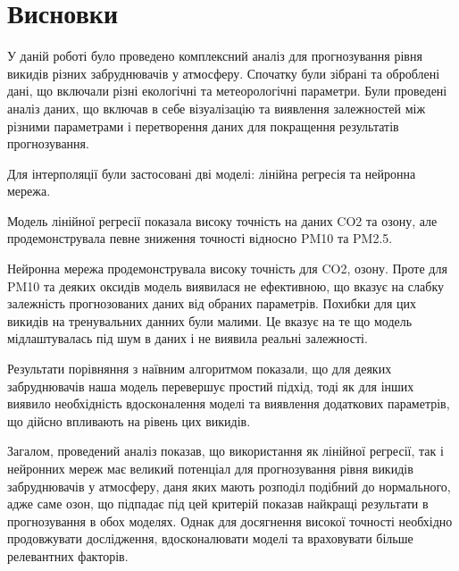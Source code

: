 \chapter{Висновки}

У даній роботі було проведено комплексний аналіз для прогнозування рівня викидів різних забруднювачів у атмосферу. 
Спочатку були зібрані та оброблені дані, що включали різні екологічні та метеорологічні параметри. 
Були проведені аналіз даних, що включав в себе візуалізацію та виявлення залежностей між різними параметрами і перетворення даних для покращення результатів прогнозування.

Для інтерполяції були застосовані дві моделі: лінійна регресія та нейронна мережа.

Модель лінійної регресії показала високу точність на даних CO2 та озону, але продемонструвала певне зниження точності відносно PM10 та PM2.5. 

Нейронна мережа продемонструвала високу точність для CO2, озону. 
Проте для PM10 та деяких оксидів модель виявилася не ефективною, що вказує на слабку залежність прогнозованих даних від обраних параметрів. 
Похибки для цих викидів на тренувальних данних були малими. 
Це вказує на те що модель мідлаштувалась під шум в даних і не виявила реальні залежності.

Результати порівняння з наївним алгоритмом показали, що для деяких забруднювачів наша модель перевершує простий підхід, тоді як для інших виявило необхідність вдосконалення моделі та виявлення додаткових параметрів, що дійсно впливають на рівень цих викидів.

Загалом, проведений аналіз показав, що використання як лінійної регресії, так і нейронних мереж має великий потенціал для прогнозування рівня викидів забруднювачів у атмосферу, даня яких мають розподіл подібний до нормального, адже саме озон, що підпадає під цей критерій показав найкращі результати в прогнозування в обох моделях. 
Однак для досягнення високої точності необхідно продовжувати дослідження, вдосконалювати моделі та враховувати більше релевантних факторів.
